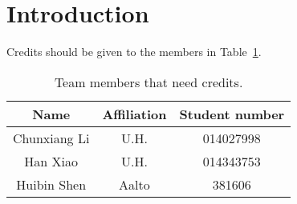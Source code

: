 
\section{Introduction}

Credits should be given to the members in Table~\ref{member_credit}.

\begin{table}[ht]
	\begin{center}
		\begin{tabular}{|c|c|c|} \hline
			\textbf{Name} & \textbf{Affiliation} & \textbf{Student number} \\ \hline
			Chunxiang Li & U.H. & 014027998\\ \hline
			Han Xiao & U.H. &  014343753 \\ \hline
			Huibin Shen & Aalto & 381606 \\ \hline
		\end{tabular}
	\end{center}
	\caption{Team members that need credits.}
	\label{member_credit}
\end{table}
